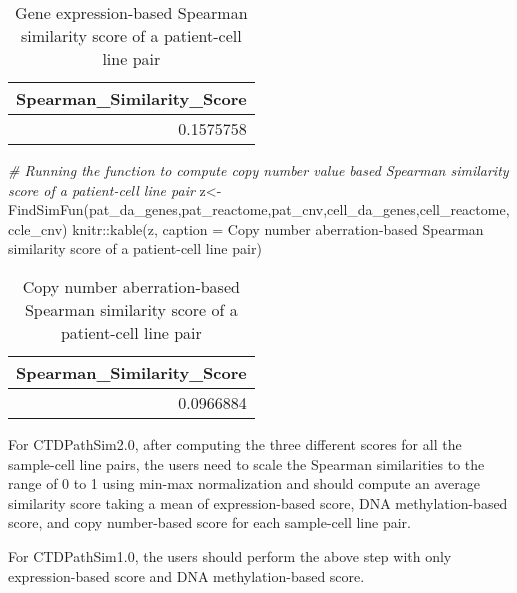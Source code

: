 \documentclass[]{article}
\newcommand{\hlstr}[1]{\textcolor[rgb]{0.251,0.627,0.251}{#1}}%
\newcommand{\hlcom}[1]{\textcolor[rgb]{0.502,0.502,0.502}{\textit{#1}}}%
\newcommand{\hlstd}[1]{\textcolor[rgb]{0.251,0.251,0.251}{#1}}%
\newenvironment{Shaded}{\begin{myshaded}}{\end{myshaded}}
\newcommand{\SpecialCharTok}[1]{\hlstr{#1}}
\newcommand{\StringTok}[1]{\hlstr{#1}}
\newcommand{\CommentTok}[1]{\hlcom{#1}}
\newcommand{\OtherTok}[1]{{#1}}
\newcommand{\FunctionTok}[1]{\hlstd{#1}}
\newcommand{\AttributeTok}[1]{{#1}}
\newcommand{\NormalTok}[1]{\hlstd{#1}}
\begin{document}
\begin{table}

\caption{\label{tab:unnamed-chunk-84}Gene expression-based Spearman similarity score of a patient-cell line pair}
\centering
\begin{tabular}[t]{r}
\hline
Spearman\_Similarity\_Score\\
\hline
0.1575758\\
\hline
\end{tabular}
\end{table}

\begin{Shaded}
\begin{Highlighting}[]
\CommentTok{\# Running the function to compute copy number value based Spearman similarity score of a patient{-}cell line pair}
\NormalTok{z}\OtherTok{\textless{}{-}}\FunctionTok{FindSimFun}\NormalTok{(pat\_da\_genes,pat\_reactome,pat\_cnv,cell\_da\_genes,cell\_reactome,ccle\_cnv)}
\NormalTok{knitr}\SpecialCharTok{::}\FunctionTok{kable}\NormalTok{(z, }\AttributeTok{caption =} \StringTok{\textquotesingle{}Copy number aberration{-}based Spearman similarity score of a patient{-}cell line pair\textquotesingle{}}\NormalTok{)}
\end{Highlighting}
\end{Shaded}

\begin{table}

\caption{\label{tab:unnamed-chunk-84}Copy number aberration-based Spearman similarity score of a patient-cell line pair}
\centering
\begin{tabular}[t]{r}
\hline
Spearman\_Similarity\_Score\\
\hline
0.0966884\\
\hline
\end{tabular}
\end{table}

For CTDPathSim2.0, after computing the three different scores for all the sample-cell line pairs, the users need to scale the Spearman similarities to the range of 0 to 1 using min-max normalization and should compute an average similarity score taking a mean of expression-based score, DNA methylation-based score, and copy number-based score for each sample-cell line pair.

For CTDPathSim1.0, the users should perform the above step with only expression-based score and DNA methylation-based score.
\end{document}
